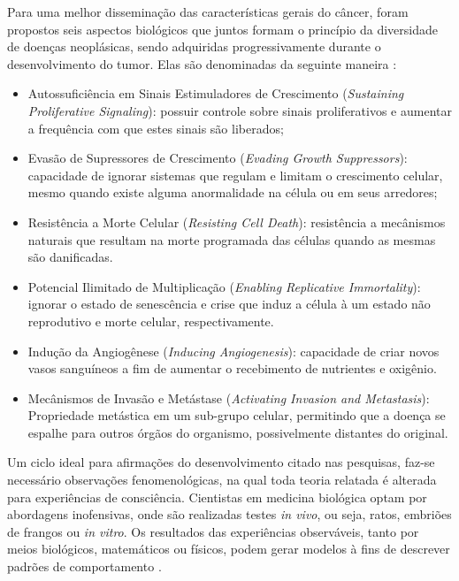\documentclass[12pt]{article}
\begin{document}
Para uma melhor disseminação das características gerais do câncer, foram propostos seis aspectos biológicos que juntos formam o princípio da diversidade de doenças neoplásicas, sendo adquiridas progressivamente durante o desenvolvimento do tumor. Elas são denominadas da seguinte maneira \cite{Hanahan2011}:

\begin{itemize}
  \item Autossuficiência em Sinais Estimuladores de Crescimento (\textit{Sustaining Proliferative Signaling}): possuir controle sobre sinais proliferativos e aumentar a frequência com que estes sinais são liberados;
  \item Evasão de Supressores de Crescimento (\textit{Evading Growth Suppressors}): capacidade de ignorar sistemas que regulam e limitam o crescimento celular, mesmo quando existe alguma anormalidade na célula ou em seus arredores;
  \item Resistência a Morte Celular (\textit{Resisting Cell Death}): resistência a mecânismos naturais que resultam na morte programada das células quando as mesmas são danificadas.
  \item Potencial Ilimitado de Multiplicação (\textit{Enabling Replicative Immortality}): ignorar o estado de senescência e crise que induz a célula à um estado não reprodutivo e morte celular, respectivamente.
  \item Indução da Angiogênese (\textit{Inducing Angiogenesis}): capacidade de criar novos vasos sanguíneos a fim de aumentar o recebimento de nutrientes e oxigênio.
  \item Mecânismos de Invasão e Metástase (\textit{Activating Invasion and Metastasis}): Propriedade metástica em um sub-grupo celular, permitindo que a doença se espalhe para outros órgãos do organismo, possivelmente distantes do original.
\end{itemize}


Um ciclo ideal para afirmações do desenvolvimento citado nas pesquisas, faz-se necessário observações fenomenológicas, na qual toda teoria relatada é alterada para experiências de consciência. Cientistas em medicina biológica optam por abordagens inofensivas, onde são realizadas testes \textit{in vivo}, ou seja, ratos, embriões de frangos ou \textit{in vitro}. Os resultados das experiências observáveis, tanto por meios biológicos, matemáticos ou físicos, podem gerar modelos à fins de descrever padrões de comportamento \cite{Preziosi2003}.
\end{document}

